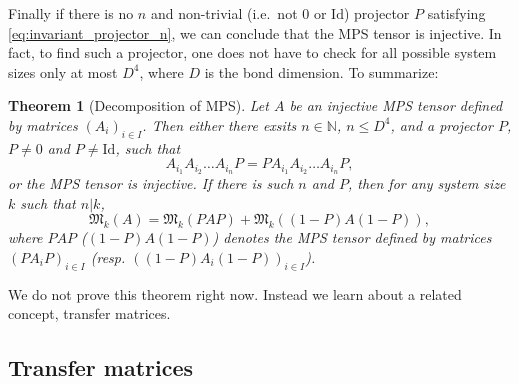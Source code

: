 \documentclass{article}
\newtheorem{theorem}{Theorem}
\newcommand{\id}{\mathrm{Id}}
\begin{document}
Finally if there is no $n$ and non-trivial (i.e.\ not $0$ or $\id$) projector $P$ satisfying \cref{eq:invariant_projector_n}, we can conclude that the MPS tensor is injective. In fact, to find such a projector, one does not have to check for all possible system sizes only at most $D^4$, where $D$ is the bond dimension. To summarize:
\begin{theorem}[Decomposition of MPS]\label{thm:MPS_decomposition}
  Let $A$ be an injective MPS tensor defined by matrices $(A_i)_{i\in I}$. Then either there exsits $n\in \mathbb{N}$, $n\leq D^4$, and a projector $P$, $P\neq 0$ and $P\neq \id$, such that 
  \begin{equation*}
    A_{i_1} A_{i_2} \dots A_{i_n} P = P  A_{i_1} A_{i_2} \dots A_{i_n} P, 
  \end{equation*}
  or the MPS tensor is injective. If there is such $n$ and $P$, then for any system size $k$ such that $n|k$, 
  \begin{equation*}
    \mathfrak{M}_k(A) =     \mathfrak{M}_k(PAP) +     \mathfrak{M}_k((1-P)A(1-P)),
  \end{equation*} 
  where $PAP$ ($(1-P)A(1-P)$) denotes the MPS tensor defined by matrices $(PA_iP)_{i\in I}$ (resp. $((1-P)A_i(1-P))_{i\in I}$).  
\end{theorem}

We do not prove this theorem right now. Instead we learn about a related concept, transfer matrices.

\subsection{Transfer matrices}
\end{document}

